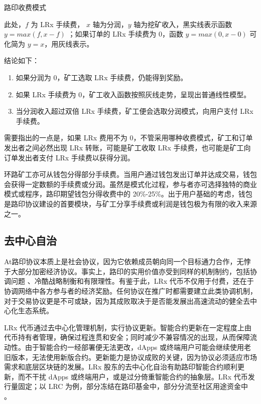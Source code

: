 \documentclass[UTF8,nofonts]{ctexart}%
\makeatletter
\newenvironment{figurehere}
 {\def\@captype{figure}}
 {}
\makeatother
\begin{document}
\begin{multicols}{2}
\begin{center}
\begin{figurehere}
\begin{tikzpicture}[
font=\bfseries\footnotesize\sffamily,
oneway/.style={->,dashed,shorten >=2pt,shorten <=2pt,>=stealth},
scale=1]
\end{tikzpicture}
\caption{路印收费模式}
\label{fig:feemodel}
\end{figurehere}
\end{center}


此处，$f$ 为 LRx 手续费， $x$ 轴为分润，$y$ 轴为挖矿收入，黑实线表示函数$y=max(f, x-f)$ ；如果订单的 LRx 手续费为 $0$，函数 $y=max(0, x - 0)$ 可化简为 $y=x$，用灰线表示。


结论如下： 
\begin{enumerate}
	\item 如果分润为 0，矿工选取 LRx 手续费，仍能得到奖励。 
	\item 如果 LRx 手续费为 0，矿工收入函数按照灰线走势，呈现出普通线性模型。
	\item 当分润收入超过双倍 LRx 手续费，矿工便会选取分润模式，向用户支付 LRx 手续费。
\end{enumerate}

需要指出的一点是，如果 LRx 费用不为 0，不管采用哪种收费模式，矿工和订单发出者之间必然出现 LRx 转账，可能是矿工收取 LRx 手续费，也可能是矿工向订单发出者支付 LRx 手续费以获得分润。

环路矿工亦可从钱包分得部分手续费。当用户通过钱包发出订单并达成交易，钱包会获得一定数额的手续费或分润。虽然是模式化过程，参与者亦可选择独特的商业模式或程序，路印期望钱包分得收费中的 20\%-25\%。出于用户基础的考虑，钱包是路印协议建设的首要模块，与矿工分享手续费或利润是钱包极为有限的收入来源之一。

\subsection{去中心自治}
At路印协议本质上是社会协议，因为它依赖成员朝向同一个目标通力合作，无悖于大部分加密经济协议。事实上，路印的实用价值亦受到同样的机制制约，包括协调问题 \cite{vitalikgovernance}、冷酷战略制衡和有限理性。有鉴于此，LRx 代币不仅用于付费，还在于协调网络中各方参与者的经济奖励。任何协议在推广时都需要建立此类协调机制，对于交易协议更是不可或缺，因为其成败取决于是否能发展出高速流动的健全去中心化生态系统。


LRx 代币通过去中心化管理机制，实行协议更新。智能合约更新在一定程度上由代币持有者管理，确保过程连贯和安全；同时减少不兼容情况的出现，从而保障流动性。由于智能合约一经部署便无法更改，dApps 或终端用户可能会继续使用老旧版本，无法使用新版合约。更新能力是协议成败的关键，因为协议必须适应市场需求和底层区块链的发展。LRx 股东的去中心化自治有助路印智能合约顺利更新，而不干扰 dApps 或终端用户，或是过分倚重智能合约的抽象层。LRx 代币发行量固定；以 LRC 为例，部分冻结在路印基金中，部分分流至社区用途资金中 \cite{LRCtokendoc}。


\end{multicols}
\end{document}
